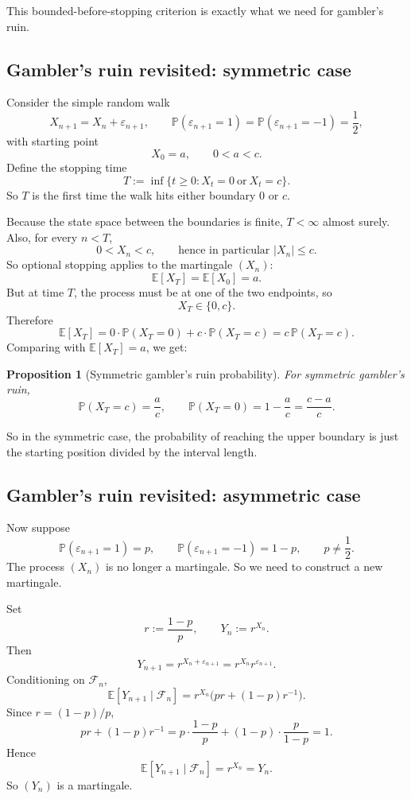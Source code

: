 \documentclass[11pt]{article}
\newtheorem{proposition}[theorem]{Proposition}
\theoremstyle{definition}
\begin{document}
This bounded-before-stopping criterion is exactly what we need for gambler's ruin.

\subsection{Gambler's ruin revisited: symmetric case}

Consider the simple random walk
\[
X_{n+1}=X_n+\varepsilon_{n+1},
\qquad
\mathbb P(\varepsilon_{n+1}=1)=\mathbb P(\varepsilon_{n+1}=-1)=\frac12,
\]
with starting point
\[
X_0=a,\qquad 0<a<c.
\]
Define the stopping time
\[
T:=\inf\{t\ge 0:X_t=0\ \text{or}\ X_t=c\}.
\]
So \(T\) is the first time the walk hits either boundary \(0\) or \(c\).

Because the state space between the boundaries is finite, \(T<\infty\) almost surely. Also, for every \(n<T\),
\[
0<X_n<c,
\qquad \text{hence in particular } |X_n|\le c.
\]
So optional stopping applies to the martingale \((X_n)\):
\[
\mathbb E[X_T]=\mathbb E[X_0]=a.
\]
But at time \(T\), the process must be at one of the two endpoints, so
\[
X_T\in\{0,c\}.
\]
Therefore
\[
\mathbb E[X_T]=0\cdot \mathbb P(X_T=0)+c\cdot \mathbb P(X_T=c)=c\,\mathbb P(X_T=c).
\]
Comparing with \(\mathbb E[X_T]=a\), we get:

\begin{proposition}[Symmetric gambler's ruin probability]
For symmetric gambler's ruin,
\[
\mathbb P(X_T=c)=\frac{a}{c},
\qquad
\mathbb P(X_T=0)=1-\frac{a}{c}=\frac{c-a}{c}.
\]
\end{proposition}

So in the symmetric case, the probability of reaching the upper boundary is just the starting position divided by the interval length.

\subsection{Gambler's ruin revisited: asymmetric case}

Now suppose
\[
\mathbb P(\varepsilon_{n+1}=1)=p,
\qquad
\mathbb P(\varepsilon_{n+1}=-1)=1-p,
\qquad p\ne \frac12.
\]
The process \((X_n)\) is no longer a martingale. So we need to construct a new martingale.

Set
\[
r:=\frac{1-p}{p},
\qquad
Y_n:=r^{X_n}.
\]
Then
\[
Y_{n+1}=r^{X_n+\varepsilon_{n+1}}=r^{X_n}r^{\varepsilon_{n+1}}.
\]
Conditioning on \(\mathcal F_n\),
\[
\mathbb E[Y_{n+1}\mid \mathcal F_n]
=
r^{X_n}\bigl(pr+(1-p)r^{-1}\bigr).
\]
Since \(r=(1-p)/p\),
\[
pr+(1-p)r^{-1}=p\cdot\frac{1-p}{p}+(1-p)\cdot\frac{p}{1-p}=1.
\]
Hence
\[
\mathbb E[Y_{n+1}\mid \mathcal F_n]=r^{X_n}=Y_n.
\]
So \((Y_n)\) is a martingale.
\end{document}

